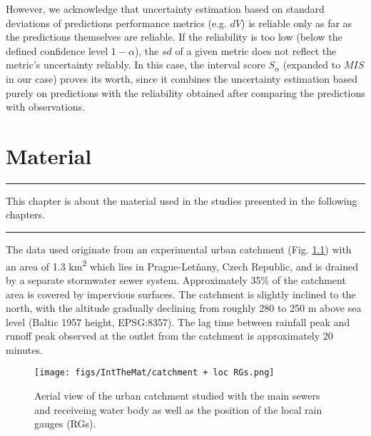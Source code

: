 \documentclass{ctuthesis}\usepackage[]{graphicx}\usepackage[]{color}
\begin{document}
However, we acknowledge that  uncertainty estimation based on  standard deviations of  predictions performance metrics (e.g. $dV$)  is reliable only as far as the predictions themselves are reliable. If the reliability is too low (below the defined confidence level $1- \alpha$), the $sd$ of a given metric does not reflect the metric's uncertainty reliably. In this case, the interval score $S_\alpha$ (expanded to  $M\!I\!S$ in our case) proves its worth, since it combines the uncertainty estimation based purely on predictions with the reliability obtained after comparing the predictions with observations.


        


\chapter{Material} \label{chap3}

\rule{\textwidth}{0.4pt}
This chapter is about the material used in the studies presented in the following chapters. \newline
\rule[0.2cm]{\textwidth}{0.4pt}


The data used originate from an experimental urban catchment (Fig. \ref{3fig1}) with an area of 1.3 km\textsuperscript{2} which lies in Prague-Letňany, Czech Republic, and is drained by a separate stormwater sewer system. Approximately 35\% of the catchment area is covered by impervious surfaces. The catchment is slightly inclined to the north, with the altitude gradually declining from roughly 280 to 250 m above sea level (Baltic 1957 height, EPSG:8357). The lag time between rainfall peak and runoff peak observed at the outlet from the catchment is approximately 20 minutes.


\begin{figure}[H]
\begin{center}
\texttt{[image: figs/IntTheMat/catchment + loc RGs.png]}
\caption{Aerial view of the urban catchment studied with the main sewers and receiveing water body as well as the position of the local rain gauges (RGs).} \label{3fig1}
\end{center}
\end{figure}
\end{document}
